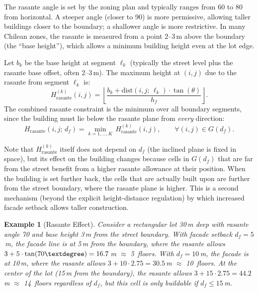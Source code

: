 \documentclass[11pt,a4paper]{article}
\newtheorem{example}{Example}
\begin{document}
The rasante angle is set by the zoning plan and typically ranges from
60\textdegree{} to 80\textdegree{} from horizontal. A steeper angle
(closer to 90\textdegree) is more permissive, allowing taller buildings
closer to the boundary; a shallower angle is more restrictive. In many
Chilean zones, the rasante is measured from a point 2--3\,m above the
boundary (the ``base height''), which allows a minimum building height
even at the lot edge.

Let $b_k$ be the base height at segment $\ell_k$ (typically the street
level plus the rasante base offset, often 2--3\,m). The maximum height
at $(i,j)$ due to the rasante from segment $\ell_k$ is:
\begin{equation}
    H_{\text{rasante}}^{(k)}(i,j) = \left\lfloor \frac{b_k + \text{dist}(i,j;\,\ell_k) \cdot \tan(\theta)}{h_f} \right\rfloor.
\end{equation}
The combined rasante constraint is the minimum over all boundary
segments, since the building must lie below the rasante plane from
\emph{every} direction:
\begin{equation}
    H_{\text{rasante}}(i,j;\,d_f) = \min_{k=1,\ldots,K}\, H_{\text{rasante}}^{(k)}(i,j), \qquad \forall (i,j) \in G(d_f).
\end{equation}

Note that $H_{\text{rasante}}^{(k)}$ itself does not depend on $d_f$
(the inclined plane is fixed in space), but its effect on the building
changes because cells in $G(d_f)$ that are far from the street benefit
from a higher rasante allowance at their position. When the building is
set further back, the cells that are actually built upon are further
from the street boundary, where the rasante plane is higher. This is a
second mechanism (beyond the explicit height-distance regulation) by
which increased facade setback allows taller construction.

\begin{example}[Rasante Effect]
Consider a rectangular lot 30\,m deep with rasante angle 70\textdegree{}
and base height 3\,m from the street boundary. With facade setback
$d_f = 5$\,m, the facade line is at 5\,m from the boundary, where the
rasante allows $3 + 5 \cdot \tan(70\textdegree) = 16.7$\,m $\approx$
5~floors. With $d_f = 10$\,m, the facade is at 10\,m, where the
rasante allows $3 + 10 \cdot 2.75 = 30.5$\,m $\approx$ 10~floors. At
the center of the lot (15\,m from the boundary), the rasante allows
$3 + 15 \cdot 2.75 = 44.2$\,m $\approx$ 14~floors regardless of
$d_f$, but this cell is only buildable if $d_f \leq 15$\,m.
\end{example}
\end{document}
